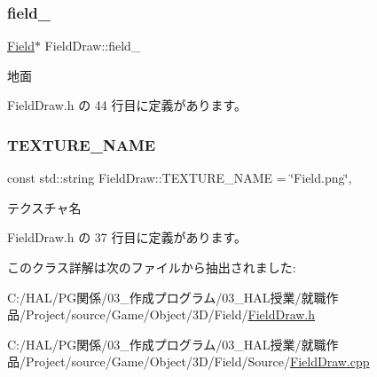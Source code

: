 \mbox{\label{class_field_draw_a5d81171db83ea98a33c0e6f68b5dd351}} 
\subsubsection{\texorpdfstring{field\+\_\+}{field\_}}
{\footnotesize\ttfamily \mbox{\hyperlink{class_field}{Field}}$\ast$ Field\+Draw\+::field\+\_\+\hspace{0.3cm}{\ttfamily [private]}}



地面 



 Field\+Draw.\+h の 44 行目に定義があります。

\mbox{\label{class_field_draw_a0100eac615b34df95aaf3627182fb9f1}} 
\subsubsection{\texorpdfstring{T\+E\+X\+T\+U\+R\+E\+\_\+\+N\+A\+ME}{TEXTURE\_NAME}}
{\footnotesize\ttfamily const std\+::string Field\+Draw\+::\+T\+E\+X\+T\+U\+R\+E\+\_\+\+N\+A\+ME = \char`\"{}Field.\+png\char`\"{}\hspace{0.3cm}{\ttfamily [static]}, {\ttfamily [private]}}



テクスチャ名 



 Field\+Draw.\+h の 37 行目に定義があります。



このクラス詳解は次のファイルから抽出されました\+:\begin{DoxyCompactItemize}
\item 
C\+:/\+H\+A\+L/\+P\+G関係/03\+\_\+作成プログラム/03\+\_\+\+H\+A\+L授業/就職作品/\+Project/source/\+Game/\+Object/3\+D/\+Field/\mbox{\hyperlink{_field_draw_8h}{Field\+Draw.\+h}}\item 
C\+:/\+H\+A\+L/\+P\+G関係/03\+\_\+作成プログラム/03\+\_\+\+H\+A\+L授業/就職作品/\+Project/source/\+Game/\+Object/3\+D/\+Field/\+Source/\mbox{\hyperlink{_field_draw_8cpp}{Field\+Draw.\+cpp}}\end{DoxyCompactItemize}
